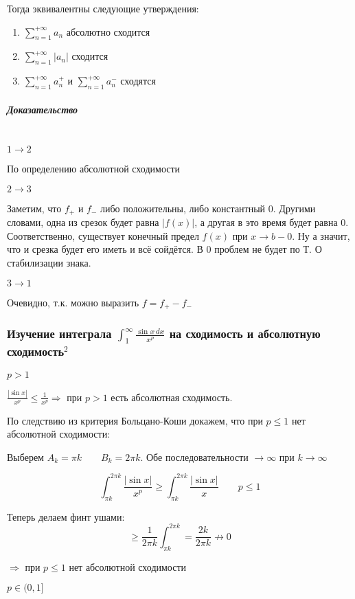 \documentclass{article}
\let\vanillasubparagraph\subparagraph
\renewcommand{\subparagraph}[1]{\vanillasubparagraph{#1}\mbox{}\\}
\begin{document}
Тогда эквивалентны следующие утверждения:
\begin{enumerate}
    \item $\sum_{n=1}^{+\infty} a_n$ абсолютно сходится
    \item $\sum_{n=1}^{+\infty} |a_n|$ сходится
    \item $\sum_{n=1}^{+\infty} a_n^+$ и $\sum_{n=1}^{+\infty} a_n^-$ сходятся
\end{enumerate}

\subparagraph{Доказательство}
\underline{$1 \rightarrow 2$}

По определению абсолютной сходимости

\underline{$2 \rightarrow 3$}

Заметим, что $f_+$ и $f_-$ либо положительны, либо константный $0$. Другими словами, одна из срезок будет равна $|f(x)|$, а другая в это время будет равна $0$. Соответственно, существует конечный предел $f(x)$ при $x \rightarrow b-0$. Ну а значит, что и срезка будет его иметь и всё сойдётся. В $0$ проблем не будет по Т. О стабилизации знака.

\underline{$3 \rightarrow 1$}

Очевидно, т.к. можно выразить $f = f_+ - f_-$

\subsubsection{Изучение интеграла \texorpdfstring{$\int_1^{\infty} \frac{\sin x\,dx}{x^p}$}{int [1, inf] sin(x) dx / x\^p} на сходимость и абсолютную сходимость\texorpdfstring{$^2$}{}}


$p > 1$

    $\frac{|\sin x|}{x^p} \leq \frac{1}{x^p} \Rightarrow$ при $p > 1$ есть абсолютная сходимость.

    По следствию из критерия Больцано-Коши докажем, что при $p \leq 1$ нет абсолютной сходимости:

    Выберем $A_k = \pi k \qquad B_k = 2\pi k$. Обе последовательности $\to \infty$ при $k \to \infty$

    $$
    \int_{\pi k} ^ {2\pi k} \frac {|\sin x|} {x^p} \geq \int _{\pi k} ^ {2 \pi k} \frac{|\sin{x}|}{x} \qquad p \leq 1
    $$

    Теперь делаем финт ушами: 
    $$
    \geq \frac{1}{2\pi k} \int_{\pi k} ^ {2\pi k} = \frac{2k}{2\pi k} \nrightarrow 0
    $$

    $\Rightarrow $ при $p \leq 1$ нет абсолютной сходимости

$p \in (0 ,1]$
\end{document}
